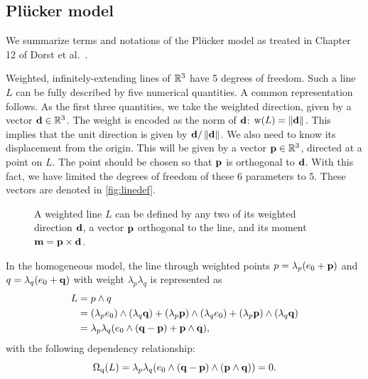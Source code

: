 \subsection{Pl\"ucker model}
\label{sec:hongbo}
\label{sec:plucker}
We summarize terms and notations of the Pl\"ucker model as treated in Chapter 12 of Dorst et al.~\cite{TheBook}.

Weighted, infinitely-extending lines of $\mathbb{R}^3$ have 5 degrees of freedom.  Such a line $L$ can be fully described by five numerical quantities.  A common representation follows.  As the first three quantities, we take the weighted direction, given by a vector $\mathbf{d} \in \mathbb{R}^3$.  The weight is encoded as the norm of $\mathbf{d}$: $\operatorname{w}(L) = \left\|\mathbf{d}\right\|$.  This implies that the unit direction is given by $\mathbf{d} / \left\|\mathbf{d}\right\|$.  We also need to know its displacement from the origin.  This will be given by a vector $\mathbf{p} \in \mathbb{R}^3$, directed at a point on $L$.  The point should be chosen so that $\mathbf{p}$ is orthogonal to $\mathbf{d}$.  With this fact, we have limited the degrees of freedom of these 6 parameters to 5.  These vectors are denoted in \autoref{fig:linedef}.

\begin{figure}
  \caption{A weighted line $L$ can be defined by any two of its weighted direction $\mathbf{d}$, a vector $\mathbf{p}$ orthogonal to the line, and its moment $\mathbf{m} = \mathbf{p} \times \mathbf{d}$.}
  \label{fig:linedef}
  \begin{center}
  \end{center}
\end{figure}

In the homogeneous model, the line through weighted points $p = \lambda_p (e_0 + \mathbf{p})$ and $q = \lambda_q (e_0 + \mathbf{q})$ with weight $\lambda_p \lambda_q$ is represented as 
\begin{align*} 
  L &= p \wedge q \\
  &= (\lambda_p e_0) \wedge (\lambda_q \mathbf{q}) + (\lambda_p \mathbf{p}) \wedge (\lambda_q e_0) + (\lambda_p \mathbf{p}) \wedge (\lambda_q \mathbf{q}) \\
  &= \lambda_p\lambda_q (e_0 \wedge (\mathbf{q} - \mathbf{p}) + \mathbf{p} \wedge \mathbf{q}) ,
\end{align*}
with the following dependency relationship: 
\begin{equation} \label{eq:gaplucker0} 
  \operatorname{\Omega_q}(L) = \lambda_p \lambda_q (e_0 \wedge (\mathbf{q} - \mathbf{p}) \wedge (\mathbf{p} \wedge \mathbf{q})) = 0 .
\end{equation}

